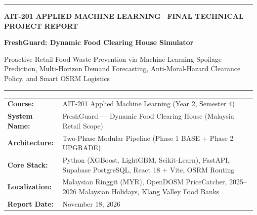 \documentclass[11pt,a4paper]{article}
\renewcommand{\_}{\oldunderscore\allowbreak}
\begin{document}
\begin{titlepage}
    \thispagestyle{empty}
    \vspace*{1mm}
    {\color{RoyalAccent}\rule{\textwidth}{2.2pt}}
    \vspace{4mm}

    {\small\bfseries\color{TealAccent}\uppercase{AIT-201 Applied Machine Learning \textbullet\ Final Technical Project Report}}

    \vspace{3mm}
    {\Huge\bfseries\color{NavyPrimary}FreshGuard: Dynamic Food Clearing House Simulator\par}
    \vspace{2.5mm}
    {\large\color{SlateDark}Proactive Retail Food Waste Prevention via Machine Learning Spoilage Prediction, Multi-Horizon Demand Forecasting, Anti-Moral-Hazard Clearance Policy, and Smart OSRM Logistics\par}

    \vspace{4mm}
    {\color{BorderGray}\rule{\textwidth}{0.8pt}}
    \vspace{4mm}

    \begin{tcolorbox}[
        colback=LightBg,
        colframe=BorderGray,
        boxrule=0.7pt,
        arc=3pt,
        top=7pt, bottom=7pt, left=10pt, right=10pt
    ]
        \renewcommand{\arraystretch}{1.15}
        {\small
        \begin{tabularx}{\textwidth}{@{} >{\bfseries\color{NavyPrimary}}l >{\raggedright\arraybackslash}X @{}}
            Course:          & AIT-201 Applied Machine Learning (Year 2, Semester 4) \\
            System Name:     & FreshGuard --- Dynamic Food Clearing House (Malaysia Retail Scope) \\
            Architecture:    & Two-Phase Modular Pipeline (Phase 1 BASE + Phase 2 UPGRADE) \\
            Core Stack:      & Python (XGBoost, LightGBM, Scikit-Learn), FastAPI, Supabase PostgreSQL, React 18 + Vite, OSRM Routing \\
            Localization:    & Malaysian Ringgit (MYR), OpenDOSM PriceCatcher, 2025--2026 Malaysian Holidays, Klang Valley Food Banks \\
            Report Date:     & November 18, 2026 \\
        \end{tabularx}}
    \end{tcolorbox}


\end{titlepage}
\end{document}
